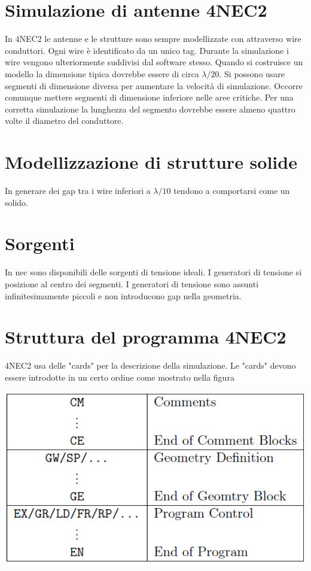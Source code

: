 \documentclass[10pt,a4paper]{book}
\begin{document}
\section{Simulazione di antenne 4NEC2}
In 4NEC2 le antenne e le strutture sono sempre modellizzate con attraverso wire conduttori. Ogni wire è identificato da un unico tag. Durante la simulazione i wire vengono ulteriormente suddivisi dal software stesso. Quando si costruisce un modello la dimensione tipica dovrebbe essere di circa $\lambda/20$. Si possono usare segmenti di dimensione diversa per aumentare la velocità di simulazione. Occorre comunque mettere segmenti di dimensione inferiore nelle aree critiche. Per una corretta simulazione la lunghezza del segmento dovrebbe essere almeno quattro volte il diametro del conduttore.
\section{Modellizzazione di strutture solide}
In generare dei gap tra i wire inferiori a $\lambda/10$ tendono a comportarsi come un solido.
\section{Sorgenti}
In nec sono disponibili delle sorgenti di tensione ideali. I generatori di tensione si posizione al centro  dei segmenti. I generatori di tensione sono assunti infinitesimamente piccoli e non introducono gap nella geometria.
\section{Struttura del programma 4NEC2}
4NEC2 usa delle "cards" per la descrizione della simulazione. Le "cards" devono essere introdotte in un certo ordine come mostrato nella figura

\includegraphics[scale=0.5]{img/Antenne/4NEC2_Card_Structure.png} 
\end{document}
